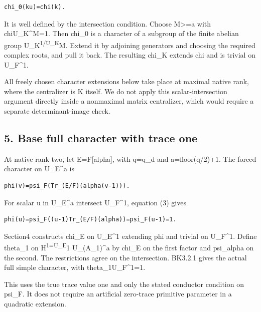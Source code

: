 \begin{Verbatim}[fontsize=\small,breaklines=true,breakanywhere=true]
chi_0(ku)=chi(k).
\end{Verbatim}

It is well defined by the intersection condition. Choose M\textgreater=a
with chi\textbar U\_K\^{}M=1. Then chi\_0 is a character of a subgroup
of the finite abelian group U\_K\textsuperscript{1/U\_K}M. Extend it by
adjoining generators and choosing the required complex roots, and pull
it back. The resulting chi\_K extends chi and is trivial on U\_F\^{}1.

All freely chosen character extensions below take place at maximal
native rank, where the centralizer is K itself. We do not apply this
scalar-intersection argument directly inside a nonmaximal matrix
centralizer, which would require a separate determinant-image check.

\hypertarget{dyadic_character-base-full-character-with-trace-one}{%
\subsection{5. Base full character with trace
one}\label{dyadic_character-base-full-character-with-trace-one}}

At native rank two, let E=F{[}alpha{]}, with q=q\_d and a=floor(q/2)+1.
The forced character on U\_E\^{}a is

\begin{Verbatim}[fontsize=\small,breaklines=true,breakanywhere=true]
phi(v)=psi_F(Tr_(E/F)(alpha(v-1))).
\end{Verbatim}

For scalar u in U\_E\^{}a intersect U\_F\^{}1, equation (3) gives

\begin{Verbatim}[fontsize=\small,breaklines=true,breakanywhere=true]
phi(u)=psi_F((u-1)Tr_(E/F)(alpha))=psi_F(u-1)=1.
\end{Verbatim}

Section4 constructs chi\_E on U\_E\^{}1 extending phi and trivial on
U\_F\^{}1. Define theta\_1 on H\textsuperscript{1=U\_E}1 U\_(A\_1)\^{}a
by chi\_E on the first factor and psi\_alpha on the second. The
restrictions agree on the intersection. BK3.2.1 gives the actual full
simple character, with theta\_1\textbar U\_F\^{}1=1.

This uses the true trace value one and only the stated conductor
condition on psi\_F. It does not require an artificial zero-trace
primitive parameter in a quadratic extension.

